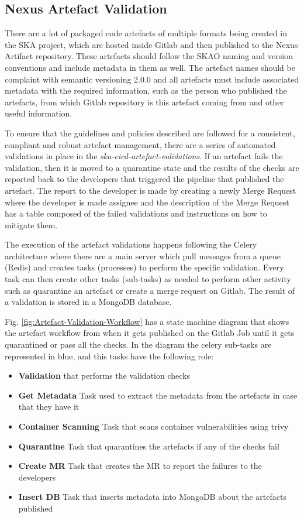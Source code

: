 \documentclass[a4paper,
               keeplastbox,   %
               ]{jacow}
\begin{document}
\subsection{Nexus Artefact Validation}

There are a lot of packaged code artefacts of multiple formats being created in the SKA project, which are hosted inside Gitlab and then published to the Nexus Artifact repository. These artefacts should follow the SKAO naming and version conventions and include metadata in them as well. The artefact names should be complaint with semantic versioning 2.0.0\cite{semver} and all artefacts must include associated metadata with the required information, such as the person who published the artefacts, from which Gitlab repository is this artefact coming from and other useful information.

To ensure that the guidelines and policies described are followed for a consistent, compliant and robust artefact management, there are a series of automated validations in place in the \textit{ska-cicd-artefact-validations}\cite{ska-cicd-artefact-validations}. 
If an artefact fails the validation, then it is moved to a quarantine state and the results of the checks are reported back to the developers that triggered the pipeline that published the artefact. The report to the developer is made by creating a newly Merge Request where the developer is made assignee and the description of the Merge Request has a table composed of the failed validations and instructions on how to mitigate them.

The execution of the artefact validations happens following the Celery architecture where there are a main server which pull messages from a queue (Redis) and creates tasks (processes) to perform the specific validation. Every task can then create other tasks (sub-tasks) as needed to perform other activity such as quarantine an artefact or create a merge request on Gitlab. The result of a validation is stored in a MongoDB database. 

Fig. \ref{fig:Artefact-Validation-Workflow} has a state machine diagram that shows the artefact workflow from when it gets published on the Gitlab Job until it gets quarantined or pass all the checks. In the diagram the celery sub-tasks are represented in blue, and this tasks have the following role:

\begin{itemize}
    \item \textbf{Validation} that performs the validation checks 
    \item \textbf{Get Metadata} Task used to extract the metadata from the artefacts in case that they have it
    \item \textbf{Container Scanning} Task that scans container vulnerabilities using trivy
    \item \textbf{Quarantine} Task that quarantines the artefacts if any of the checks fail
    \item \textbf{Create MR} Task that creates the MR to report the failures to the developers
    \item \textbf{Insert DB} Task that inserts metadata into MongoDB about the artefacts published
\end{itemize}
\end{document}
